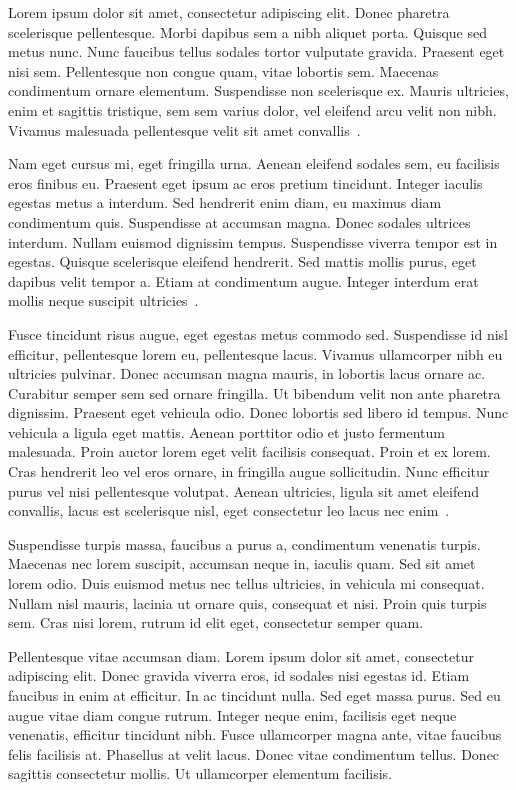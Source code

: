 



Lorem ipsum dolor sit amet, consectetur adipiscing elit. Donec pharetra scelerisque pellentesque. Morbi dapibus sem a nibh aliquet porta. Quisque sed metus nunc. Nunc faucibus tellus sodales tortor vulputate gravida. Praesent eget nisi sem. Pellentesque non congue quam, vitae lobortis sem. Maecenas condimentum ornare elementum. Suspendisse non scelerisque ex. Mauris ultricies, enim et sagittis tristique, sem sem varius dolor, vel eleifend arcu velit non nibh. Vivamus malesuada pellentesque velit sit amet convallis~.

Nam eget cursus mi, eget fringilla urna. Aenean eleifend sodales sem, eu facilisis eros finibus eu. Praesent eget ipsum ac eros pretium tincidunt. Integer iaculis egestas metus a interdum. Sed hendrerit enim diam, eu maximus diam condimentum quis. Suspendisse at accumsan magna. Donec sodales ultrices interdum. Nullam euismod dignissim tempus. Suspendisse viverra tempor est in egestas. Quisque scelerisque eleifend hendrerit. Sed mattis mollis purus, eget dapibus velit tempor a. Etiam at condimentum augue. Integer interdum erat mollis neque suscipit ultricies~.

Fusce tincidunt risus augue, eget egestas metus commodo sed. Suspendisse id nisl efficitur, pellentesque lorem eu, pellentesque lacus. Vivamus ullamcorper nibh eu ultricies pulvinar. Donec accumsan magna mauris, in lobortis lacus ornare ac. Curabitur semper sem sed ornare fringilla. Ut bibendum velit non ante pharetra dignissim. Praesent eget vehicula odio. Donec lobortis sed libero id tempus. Nunc vehicula a ligula eget mattis. Aenean porttitor odio et justo fermentum malesuada. Proin auctor lorem eget velit facilisis consequat. Proin et ex lorem. Cras hendrerit leo vel eros ornare, in fringilla augue sollicitudin. Nunc efficitur purus vel nisi pellentesque volutpat. Aenean ultricies, ligula sit amet eleifend convallis, lacus est scelerisque nisl, eget consectetur leo lacus nec enim~.

Suspendisse turpis massa, faucibus a purus a, condimentum venenatis turpis. Maecenas nec lorem suscipit, accumsan neque in, iaculis quam. Sed sit amet lorem odio. Duis euismod metus nec tellus ultricies, in vehicula mi consequat. Nullam nisl mauris, lacinia ut ornare quis, consequat et nisi. Proin quis turpis sem. Cras nisi lorem, rutrum id elit eget, consectetur semper quam.

Pellentesque vitae accumsan diam. Lorem ipsum dolor sit amet, consectetur adipiscing elit. Donec gravida viverra eros, id sodales nisi egestas id. Etiam faucibus in enim at efficitur. In ac tincidunt nulla. Sed eget massa purus. Sed eu augue vitae diam congue rutrum. Integer neque enim, facilisis eget neque venenatis, efficitur tincidunt nibh. Fusce ullamcorper magna ante, vitae faucibus felis facilisis at. Phasellus at velit lacus. Donec vitae condimentum tellus. Donec sagittis consectetur mollis. Ut ullamcorper elementum facilisis.


